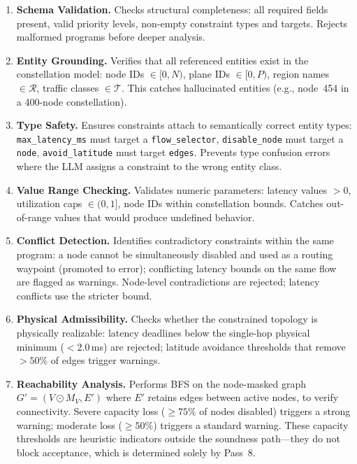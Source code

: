 \begin{enumerate}
\item \textbf{Schema Validation.} Checks structural completeness: all
required fields present, valid priority levels, non-empty constraint
types and targets. Rejects malformed programs before deeper analysis.

\item \textbf{Entity Grounding.} Verifies that all referenced entities
exist in the constellation model: node IDs $\in [0, N)$, plane IDs
$\in [0, P)$, region names $\in \mathcal{R}$, traffic classes
$\in \mathcal{T}$. This catches hallucinated entities (e.g., node~454
in a 400-node constellation).

\item \textbf{Type Safety.} Ensures constraints attach to semantically
correct entity types: \texttt{max\_latency\_ms} must target a
\texttt{flow\_selector}, \texttt{disable\_node} must target a
\texttt{node}, \texttt{avoid\_latitude} must target \texttt{edges}.
Prevents type confusion errors where the LLM assigns a constraint
to the wrong entity class.

\item \textbf{Value Range Checking.} Validates numeric parameters:
latency values $> 0$, utilization caps
$\in (0, 1]$, node IDs within constellation bounds. Catches
out-of-range values that would produce undefined behavior.

\item \textbf{Conflict Detection.} Identifies contradictory constraints
within the same program: a node cannot be simultaneously disabled and
used as a routing waypoint (promoted to error); conflicting latency bounds on the same flow
are flagged as warnings. Node-level contradictions are rejected;
latency conflicts use the stricter bound.

\item \textbf{Physical Admissibility.} Checks whether the constrained
topology is physically realizable: latency deadlines below the
single-hop physical minimum ($<2.0$\,ms) are rejected; latitude
avoidance thresholds that remove $>50\%$ of edges trigger warnings.

\item \textbf{Reachability Analysis.} Performs BFS on the node-masked
graph $G' = (V \odot M_V, E')$ where $E'$ retains edges between active nodes,
to verify connectivity.
Severe capacity loss ($\geq 75\%$ of nodes disabled) triggers a strong
warning; moderate loss ($\geq 50\%$) triggers a standard warning.
These capacity thresholds are heuristic indicators outside the
soundness path---they do not block acceptance, which is determined
solely by Pass~8.


\end{enumerate}
